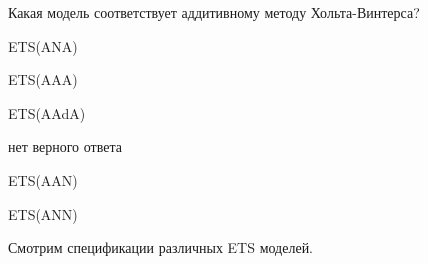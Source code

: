 
\begin{question}
Какая модель соответствует аддитивному методу Хольта-Винтерса?
\begin{answerlist}
  \item ETS(ANA)
  \item ETS(AAA)
  \item ETS(AAdA)
  \item нет верного ответа
  \item ETS(AAN)
  \item ETS(ANN)
\end{answerlist}
\end{question}

\begin{solution}
Смотрим спецификации различных ETS моделей.
\end{solution}

